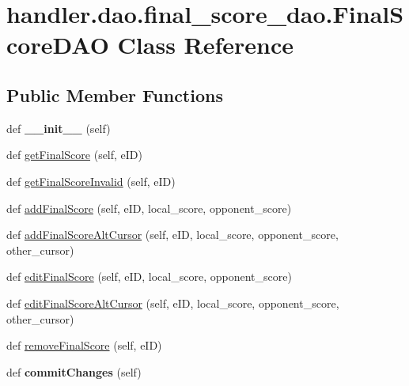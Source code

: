 \hypertarget{classhandler_1_1dao_1_1final__score__dao_1_1_final_score_d_a_o}{}\section{handler.\+dao.\+final\+\_\+score\+\_\+dao.\+Final\+Score\+D\+AO Class Reference}
\label{classhandler_1_1dao_1_1final__score__dao_1_1_final_score_d_a_o}
\subsection*{Public Member Functions}
\begin{DoxyCompactItemize}
\item 
\mbox{\label{classhandler_1_1dao_1_1final__score__dao_1_1_final_score_d_a_o_a97dad29f4a4ee11022023a80376da101}} 
def {\bfseries \+\_\+\+\_\+init\+\_\+\+\_\+} (self)
\item 
def \hyperlink{classhandler_1_1dao_1_1final__score__dao_1_1_final_score_d_a_o_a8694f4c5772c0c15fd5d50a91a4103dd}{get\+Final\+Score} (self, e\+ID)
\item 
def \hyperlink{classhandler_1_1dao_1_1final__score__dao_1_1_final_score_d_a_o_a5236be2fb1a7a2d4a0ace18bf06f6fdd}{get\+Final\+Score\+Invalid} (self, e\+ID)
\item 
def \hyperlink{classhandler_1_1dao_1_1final__score__dao_1_1_final_score_d_a_o_ad354d1c7e7a59dca95a856268d17881f}{add\+Final\+Score} (self, e\+ID, local\+\_\+score, opponent\+\_\+score)
\item 
def \hyperlink{classhandler_1_1dao_1_1final__score__dao_1_1_final_score_d_a_o_a3a0f69142e50d1193d01dad92e1e165f}{add\+Final\+Score\+Alt\+Cursor} (self, e\+ID, local\+\_\+score, opponent\+\_\+score, other\+\_\+cursor)
\item 
def \hyperlink{classhandler_1_1dao_1_1final__score__dao_1_1_final_score_d_a_o_ab1aa9c08ee3c3daf1b5dd0a482f40e24}{edit\+Final\+Score} (self, e\+ID, local\+\_\+score, opponent\+\_\+score)
\item 
def \hyperlink{classhandler_1_1dao_1_1final__score__dao_1_1_final_score_d_a_o_aafed0bf1088db869afca195a3a7e4fb2}{edit\+Final\+Score\+Alt\+Cursor} (self, e\+ID, local\+\_\+score, opponent\+\_\+score, other\+\_\+cursor)
\item 
def \hyperlink{classhandler_1_1dao_1_1final__score__dao_1_1_final_score_d_a_o_a750aa3375dc03fbc85025476a9974349}{remove\+Final\+Score} (self, e\+ID)
\item 
\mbox{\label{classhandler_1_1dao_1_1final__score__dao_1_1_final_score_d_a_o_af99181eb8ea45373a933a6c3a0bb65db}} 
def {\bfseries commit\+Changes} (self)
\end{DoxyCompactItemize}
